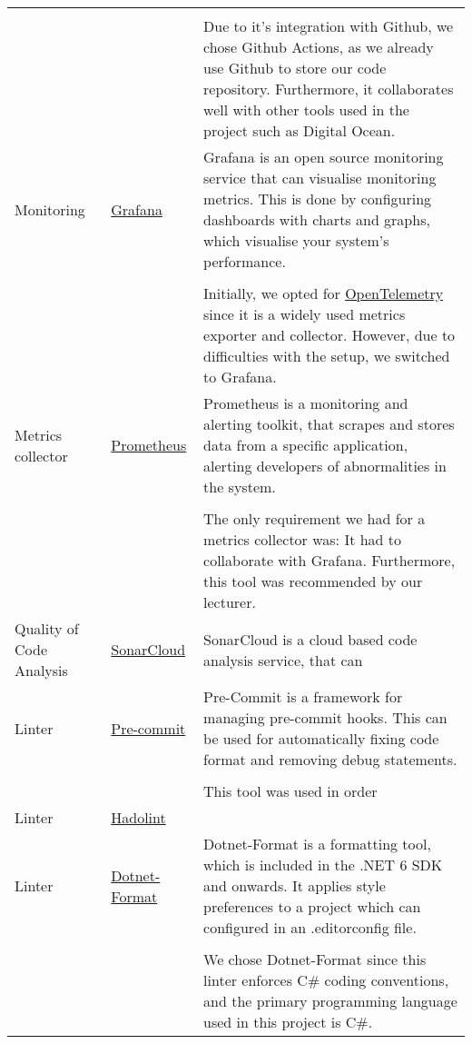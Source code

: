\begin{longtable}{|p{}|p{} | p{}|}
    &&\\
    && Due to it's integration with Github, we chose Github Actions, as we already use Github to store our code repository. Furthermore, it collaborates well with other tools used in the project such as Digital Ocean.\\
    \hline
    Monitoring & \href{https://grafana.com/}{Grafana} & Grafana is an open source monitoring service that can visualise monitoring metrics. This is done by configuring dashboards with charts and graphs, which visualise your system's performance.\\
    &&\\
    && Initially, we opted for \href{https://opentelemetry.io/}{OpenTelemetry} since it is a widely used metrics exporter and collector. However, due to difficulties with the setup, we switched to Grafana.\\ %
    \hline
    Metrics collector & \href{https://prometheus.io/docs/}{Prometheus} & Prometheus is a monitoring and alerting toolkit, that scrapes and stores data from a specific application, alerting developers of abnormalities in the system.\\
    &&\\
    && The only requirement we had for a metrics collector was: It had to collaborate with Grafana. Furthermore, this tool was recommended by our lecturer.\\
    \hline
    Quality of Code Analysis & \href{https://www.sonarsource.com/products/sonarcloud/}{SonarCloud} & SonarCloud is a cloud based code analysis service, that can \\
    \hline
    Linter & \href{https://pre-commit.com/}{Pre-commit} & Pre-Commit is a framework for managing pre-commit hooks. This can be used for automatically fixing code format and removing debug statements.\\
    &&\\
    && This tool was used in order \\
    \hline
    Linter & \href{https://github.com/hadolint/hadolint}{Hadolint} & \\
    \hline
    Linter & \href{https://learn.microsoft.com/en-us/dotnet/core/tools/dotnet-format}{Dotnet-Format} & Dotnet-Format is a formatting tool, which is included in the .NET 6 SDK and onwards. It applies style preferences to a project which can configured in an .editorconfig file.\\
    &&\\
    && We chose Dotnet-Format since this linter enforces C\# coding conventions, and the primary programming language used in this project is C\#.\\

\end{longtable}
